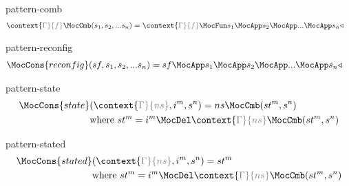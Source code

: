 \documentclass[preview]{standalone}
\begin{document}
\begin{docimage}{pattern-comb}
  \begin{align*}%
    &\context{\color{gray}\Gamma}{f} \MocCmb (s_1,s_2,...s_n) =
      \context{\color{gray}\Gamma}{f} \MocFun s_1 \MocApp s_2 \MocApp ... \MocApp s_n \triangleleft
  \end{align*}
\end{docimage}

\begin{docimage}{pattern-reconfig}
  \begin{align*}%
    & \MocCons{reconfig}(sf,s_1,s_2,...s_n) =
      sf \MocApp s_1 \MocApp s_2 \MocApp ... \MocApp s_n \triangleleft
  \end{align*}
\end{docimage}


\begin{docimage}{pattern-state}
  \begin{align*}%
    \MocCons{state} &(\context{\color{gray}\Gamma}{ns},i^m,s^n) = ns \MocCmb (st^m, s^n) \\
                    &\text{where}\ st^m = i^m \MocDel \context{\color{gray}\Gamma}{ns} \MocCmb (st^m, s^n) 
  \end{align*}
\end{docimage}

\begin{docimage}{pattern-stated}
  \begin{align*}%
    \MocCons{stated} &(\context{\color{gray}\Gamma}{ns},i^m,s^n) = st^m \\
                    &\text{where}\ st^m = i^m \MocDel \context{\color{gray}\Gamma}{ns} \MocCmb (st^m, s^n) 
  \end{align*}
\end{docimage}
\end{document}

